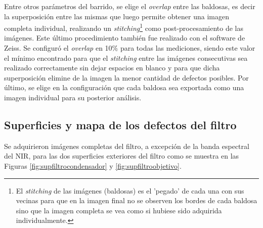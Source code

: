 \documentclass{ctuthesis}
\begin{document}
Entre otros parámetros del barrido, se elige el \textit{overlap} entre las baldosas, es decir la superposición entre las mismas que luego permite obtener una imagen completa individual,  realizando un \textit{stitching}\footnote{El \textit{stitching} de las imágenes (baldosas) es el 'pegado' de cada una con sus vecinas para que en la imagen final no se observen los bordes de cada baldosa sino que la imagen completa se vea como si hubiese sido adquirida individualmente.} como post-procesamiento de las imágenes. Este último procedimiento también fue realizado con el software de Zeiss. Se configuró el \textit{overlap} en 10$\%$ para todas las mediciones, siendo este valor el mínimo encontrado para que el \textit{stitching} entre las imágenes consecutivas sea realizado correctamente sin dejar espacios en blanco y para que dicha superposición elimine de la imagen la menor cantidad de defectos posibles. Por último, se elige en la configuración que cada baldosa sea exportada como una imagen individual para su posterior análisis.

\singlespacing
\subsection*{Superficies y mapa de los defectos del filtro}

\hspace{0.5cm}Se adquirieron imágenes completas del filtro, a excepción de la banda espectral del NIR, para las dos superficies exteriores del filtro como se muestra en las Figuras \ref{fig:supfiltrocondensador} y \ref{fig:supfiltroobjetivo}.
\end{document}
